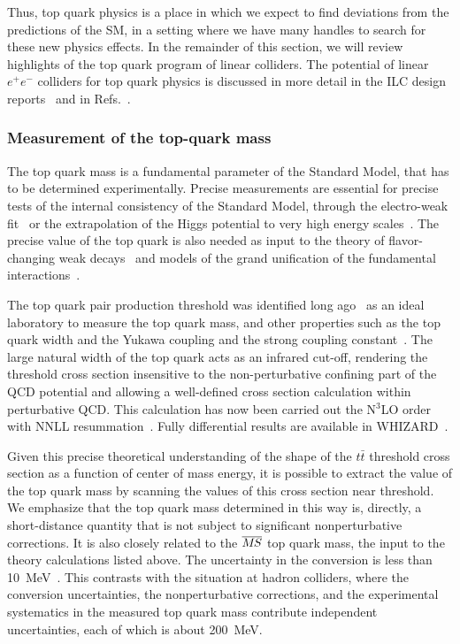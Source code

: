 Thus, top quark physics is a place in which we expect to find
deviations from the predictions of the SM, in a setting where we have
many handles to search for these new physics effects.   In the
remainder of this section, we will review highlights of the top quark
program of linear colliders.
The potential of linear $e^+e^-$ colliders for top quark physics is
discussed in more detail in the 
ILC design reports~\cite{Baer:2013cma,Behnke:2013lya}
and in Refs.~\cite{Agashe:2013hma,Vos:2016til,Abramowicz:2018rjq}.




\subsubsection{Measurement of the top-quark mass}
\label{subsubsec:highE:topmass}

The top quark mass is a fundamental parameter of the Standard Model, that has to be
determined experimentally. Precise measurements are essential for precise tests of
the internal consistency of the Standard Model, through the electro-weak
fit~\cite{Baak:2014ora} or the extrapolation of the Higgs potential to
very high energy
scales~\cite{Degrassi:2012ry}.   The precise value of the top quark is
also needed as input to the theory of flavor-changing weak
decays~\cite{Buras:2009if} and models of the grand unification of the
fundamental interactions~\cite{Langacker:1994vf}.

The top quark pair production threshold was identified long ago~\cite{Gusken:1985nf} as
an ideal laboratory to measure the top quark mass, and other properties such as the top quark
width and the Yukawa coupling and the strong coupling constant~\cite{Strassler:1990nw}.
The large natural width of the top quark acts as an infrared cut-off,
rendering the threshold cross section insensitive to the non-perturbative confining part
of the QCD potential and allowing a well-defined  cross section
calculation within  perturbative QCD.  This calculation has now been
carried out the N$^3$LO order~\cite{Beneke:2015kwa} with  NNLL resummation~\cite{Hoang:2013uda}. Fully
differential results are available in WHIZARD~\cite{Bach:2017ggt}.

Given this precise theoretical understanding of the shape of the
$t\bar t$ threshold cross section as a function of center of mass
energy, it is possible to extract the value of the top quark mass by
scanning the values of  this cross section near threshold.  We
emphasize that the top quark mass determined in this way is, directly,
a short-distance quantity that is not subject to significant
nonperturbative corrections.
It is also closely related to the $\msb$ top quark mass, the input to
the theory calculations listed above. The uncertainty in the
conversion is less than 10~MeV~\cite{Marquard:2015qpa}.  This
contrasts with the situation at hadron colliders, where the
conversion uncertainties, the nonperturbative corrections, and the
experimental systematics in the measured top quark mass
contribute  independent uncertainties, each of which is about
200~MeV. 

